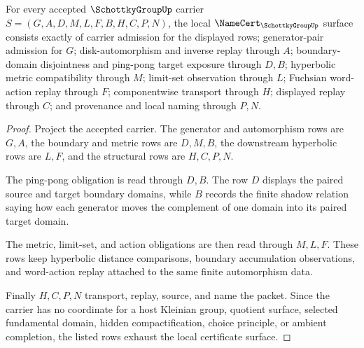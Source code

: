 \begin{theorem}\label{thm:schottky-group-namecert-obligations}
For every accepted $\SchottkyGroupUp$ carrier $S=(G,A,D,M,L,F,B,H,C,P,N)$, the local $\NameCert_{\SchottkyGroupUp}$ surface consists exactly of carrier admission for the displayed rows; generator-pair admission for $G$; disk-automorphism and inverse replay through $A$; boundary-domain disjointness and ping-pong target exposure through $D,B$; hyperbolic metric compatibility through $M$; limit-set observation through $L$; Fuchsian word-action replay through $F$; componentwise transport through $H$; displayed replay through $C$; and provenance and local naming through $P,N$.
\end{theorem}
\begin{proof}
Project the accepted carrier. The generator and automorphism rows are $G,A$, the boundary and metric rows are $D,M,B$, the downstream hyperbolic rows are $L,F$, and the structural rows are $H,C,P,N$.

The ping-pong obligation is read through $D,B$. The row $D$ displays the paired source and target boundary domains, while $B$ records the finite shadow relation saying how each generator moves the complement of one domain into its paired target domain.

The metric, limit-set, and action obligations are then read through $M,L,F$. These rows keep hyperbolic distance comparisons, boundary accumulation observations, and word-action replay attached to the same finite automorphism data.

Finally $H,C,P,N$ transport, replay, source, and name the packet. Since the carrier has no coordinate for a host Kleinian group, quotient surface, selected fundamental domain, hidden compactification, choice principle, or ambient completion, the listed rows exhaust the local certificate surface.
\end{proof}

